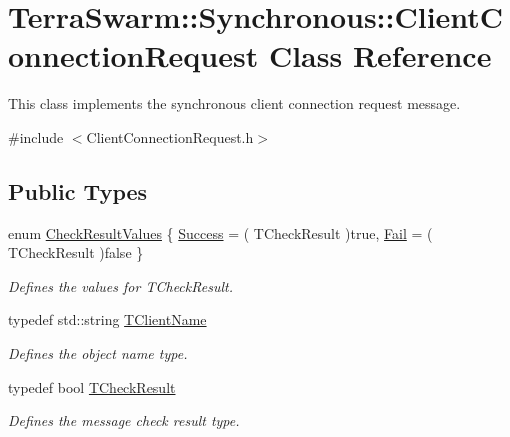 \hypertarget{class_terra_swarm_1_1_synchronous_1_1_client_connection_request}{\section{Terra\-Swarm\-:\-:Synchronous\-:\-:Client\-Connection\-Request Class Reference}
\label{class_terra_swarm_1_1_synchronous_1_1_client_connection_request}
}


This class implements the synchronous client connection request message.  




{\ttfamily \#include $<$Client\-Connection\-Request.\-h$>$}

\subsection*{Public Types}
\begin{DoxyCompactItemize}
\item 
enum \hyperlink{class_terra_swarm_1_1_synchronous_1_1_client_connection_request_a784811f86bbc4a1f1232bdbb579db93d}{Check\-Result\-Values} \{ \hyperlink{class_terra_swarm_1_1_synchronous_1_1_client_connection_request_a784811f86bbc4a1f1232bdbb579db93da20fdb875e0dbe807b95684298bac22bc}{Success} = ( T\-Check\-Result )true, 
\hyperlink{class_terra_swarm_1_1_synchronous_1_1_client_connection_request_a784811f86bbc4a1f1232bdbb579db93da78a023654a74eef1adaae15475a5fa3f}{Fail} = ( T\-Check\-Result )false
 \}
\begin{DoxyCompactList}\small\item\em Defines the values for T\-Check\-Result. \end{DoxyCompactList}\item 
typedef std\-::string \hyperlink{class_terra_swarm_1_1_synchronous_1_1_client_connection_request_a7d85ca6773adf2b3b32cfbff9706f882}{T\-Client\-Name}
\begin{DoxyCompactList}\small\item\em Defines the object name type. \end{DoxyCompactList}\item 
typedef bool \hyperlink{class_terra_swarm_1_1_synchronous_1_1_client_connection_request_af97d7c46396bc29dd8a2628f32a434f2}{T\-Check\-Result}
\begin{DoxyCompactList}\small\item\em Defines the message check result type. \end{DoxyCompactList}\end{DoxyCompactItemize}
